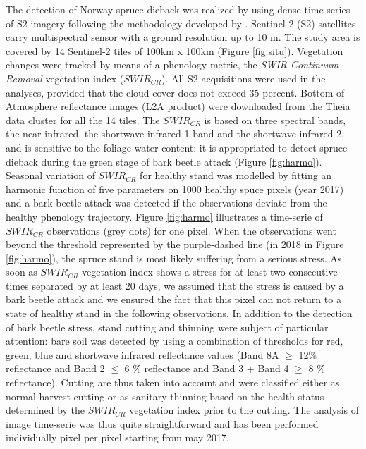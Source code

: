 \documentclass[3p,procedia]{elsarticle}
\begin{document}
The detection of Norway spruce dieback was realized by using dense time series of S2 imagery following the methodology developed by \cite{dutrieux_package_2021}.
Sentinel-2 (S2) satellites carry multispectral sensor with a ground resolution up to 10 m.
The study area is covered by 14 Sentinel-2 tiles of 100km x 100km (Figure \ref{fig:situ}).  
Vegetation changes were tracked by means of a phenology metric, the \textit{SWIR Continuum Removal} vegetation index ($SWIR_{CR}$).
All S2 acquisitions were used in the analyses, provided that the cloud cover does not exceed 35 percent. 
Bottom of Atmosphere reflectance images (L2A product) were downloaded from the Theia data cluster \citep{theia_team} for all the 14 tiles.
The $SWIR_{CR}$ is based on three spectral bands, the near-infrared, the shortwave infrared 1 band and the shortwave infrared 2, and is sensitive to the foliage water content: it is appropriated to detect spruce dieback during the green stage of bark beetle attack (Figure \ref{fig:harmo}).
Seasonal variation of $SWIR_{CR}$ for healthy stand was modelled by fitting an harmonic function of five parameters on 1000 healthy spuce pixels (year 2017) and a bark beetle attack was detected if the observations deviate from the healthy phenology trajectory. 
Figure \ref{fig:harmo} illustrates a time-serie of $SWIR_{CR}$ observations (grey dots) for one pixel. 
When the observations went beyond the threshold represented by the purple-dashed line (in 2018 in Figure \ref{fig:harmo}), the spruce stand is most likely suffering from a serious stress.
As soon as $SWIR_{CR}$ vegetation index shows a stress for at least two consecutive times separated by at least 20 days, we assumed that the stress is caused by a bark beetle attack and we ensured the fact that this pixel can not return to a state of healthy stand in the following observations.
In addition to the detection of bark beetle stress, stand cutting and thinning were subject of particular attention: 
bare soil was detected by using a combination of thresholds for red, green, blue and shortwave infrared reflectance values (Band 8A $\geq$ 12\% reflectance and Band 2 $\leq$ 6 \% reflectance and Band 3 + Band 4 $\geq$ 8 \% reflectance).
Cutting are thus taken into account and were classified either as normal harvest cutting or as sanitary thinning based on the health status determined by the $SWIR_{CR}$ vegetation index prior to the cutting.
The analysis of image time-serie was thus quite straightforward and has been performed individually pixel per pixel starting from may 2017.%
\end{document}
